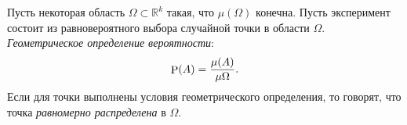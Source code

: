 \begin{to_def}
    Пусть некоторая область $\Omega \subset \mathbb{R}^k$ такая, что $\mu(\Omega)$ конечна. Пусть эксперимент состоит из равновероятного выбора случайной точки в области $\Omega$. \textit{Геометрическое определение вероятности}:
    \begin{equation*}
        \P (A) = \frac{\mu(A)}{\mu \Omega}.
    \end{equation*}
    Если для точки выполнены условия геометрического определения, то говорят, что точка \textit{равномерно распределена} в $\Omega$. 
\end{to_def}


